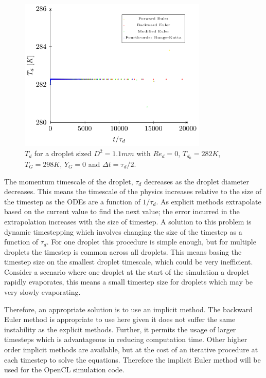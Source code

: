 \documentclass[../Interim_Report_Master]{subfiles}
\begin{document}
\begin{figure}[H]
	\centering
	\includegraphics[width=0.8\textwidth]{./Diagrams/Coupled_Heat_Mass_Transfer_tau_2_nd/Coupled_Heat_Transfer_tau_2_nd.pdf}
	\caption{$T_d$ for a droplet sized $D^2=1.1mm$ with $Re_d=0$, $T_{d_0}=282K$, $T_G=298K$, $Y_G=0$ and $\Delta t=\tau_d/2$.}
	\label{coupled_heat_tau_2_nd}
\end{figure}

The momentum timescale of the droplet, $\tau_d$ decreases as the droplet diameter decreases. This means the timescale of the physics increases relative to the size of the timestep as the ODEs are a function of $1/\tau_d$. As explicit methods extrapolate based on the current value to find the next value; the error incurred in the extrapolation increases with the size of timestep. A solution to this problem is dynamic timestepping which involves changing the size of the timestep as a function of $\tau_d$. For one droplet this procedure is simple enough, but for multiple droplets the timestep is common across all droplets. This means basing the timestep size on the smallest droplet timescale, which could be very inefficient. Consider a scenario where one droplet at the start of the simulation a droplet rapidly evaporates, this means a small timestep size for droplets which may be very slowly evaporating. 

Therefore, an appropriate solution is to use an implicit method. The backward Euler method is appropriate to use here given it does not suffer the same instability as the explicit methods. Further, it permits the usage of larger timesteps which is advantageous in reducing computation time. Other higher order implicit methods are available, but at the cost of an iterative procedure at each timestep to solve the equations. Therefore the implicit Euler method will be used for the OpenCL simulation code. 
\end{document}
